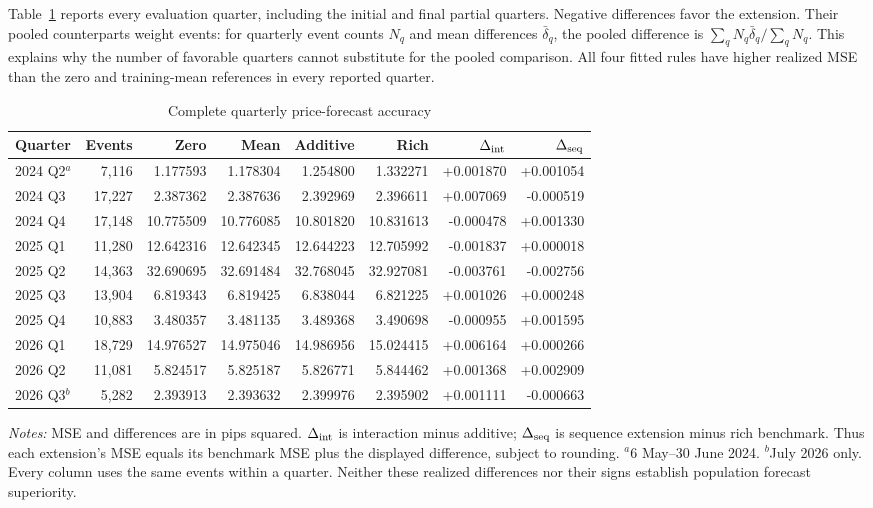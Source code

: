 \documentclass[12pt,letterpaper]{article}
\begin{document}
Table~\ref{tab:fullquarters} reports every evaluation quarter, including the initial and final partial quarters. Negative differences favor the extension. Their pooled counterparts weight events: for quarterly event counts $N_q$ and mean differences $\bar\delta_q$, the pooled difference is $\sum_qN_q\bar\delta_q/\sum_qN_q$. This explains why the number of favorable quarters cannot substitute for the pooled comparison. All four fitted rules have higher realized MSE than the zero and training-mean references in every reported quarter.

\begin{table}[htbp]
\centering
\caption{Complete quarterly price-forecast accuracy}
\label{tab:fullquarters}
\small
\setlength{\tabcolsep}{3pt}
\begin{tabular}{lrrrrrrr}
\toprule
Quarter & Events & Zero & Mean & Additive & Rich & $\Delta_{\rm int}$ & $\Delta_{\rm seq}$\\
\midrule
2024 Q2$^{a}$ & 7,116 & 1.177593 & 1.178304 & 1.254800 & 1.332271 & +0.001870 & +0.001054 \\
2024 Q3 & 17,227 & 2.387362 & 2.387636 & 2.392969 & 2.396611 & +0.007069 & -0.000519 \\
2024 Q4 & 17,148 & 10.775509 & 10.776085 & 10.801820 & 10.831613 & -0.000478 & +0.001330 \\
2025 Q1 & 11,280 & 12.642316 & 12.642345 & 12.644223 & 12.705992 & -0.001837 & +0.000018 \\
2025 Q2 & 14,363 & 32.690695 & 32.691484 & 32.768045 & 32.927081 & -0.003761 & -0.002756 \\
2025 Q3 & 13,904 & 6.819343 & 6.819425 & 6.838044 & 6.821225 & +0.001026 & +0.000248 \\
2025 Q4 & 10,883 & 3.480357 & 3.481135 & 3.489368 & 3.490698 & -0.000955 & +0.001595 \\
2026 Q1 & 18,729 & 14.976527 & 14.975046 & 14.986956 & 15.024415 & +0.006164 & +0.000266 \\
2026 Q2 & 11,081 & 5.824517 & 5.825187 & 5.826771 & 5.844462 & +0.001368 & +0.002909 \\
2026 Q3$^{b}$ & 5,282 & 2.393913 & 2.393632 & 2.399976 & 2.395902 & +0.001111 & -0.000663 \\
\bottomrule
\end{tabular}
\begin{minipage}{0.98\linewidth}\small
\emph{Notes:} MSE and differences are in pips squared. $\Delta_{\rm int}$ is interaction minus additive; $\Delta_{\rm seq}$ is sequence extension minus rich benchmark. Thus each extension's MSE equals its benchmark MSE plus the displayed difference, subject to rounding. $^{a}$6 May--30 June 2024. $^{b}$July 2026 only. Every column uses the same events within a quarter. Neither these realized differences nor their signs establish population forecast superiority.
\end{minipage}
\end{table}
\end{document}
